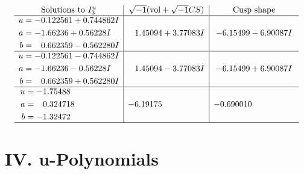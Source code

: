 \documentclass[1p]{elsarticle_modified}
\theoremstyle{definition}
\newcommand{\I}{\sqrt{-1}}
\begin{document}
$$\begin{array}{c|c|c}  
\text{Solutions to }I^u_{3}& \I (\text{vol} + \sqrt{-1}CS) & \text{Cusp shape}\\
 \hline 
\begin{aligned}
u &= -0.122561 + 0.744862 I \\
a &= -1.66236 + 0.56228 I \\
b &= \phantom{-}0.662359 - 0.562280 I\end{aligned}
 & \phantom{-}1.45094 + 3.77083 I & -6.15499 - 6.90087 I \\ \hline\begin{aligned}
u &= -0.122561 - 0.744862 I \\
a &= -1.66236 - 0.56228 I \\
b &= \phantom{-}0.662359 + 0.562280 I\end{aligned}
 & \phantom{-}1.45094 - 3.77083 I & -6.15499 + 6.90087 I \\ \hline\begin{aligned}
u &= -1.75488\phantom{ +0.000000I} \\
a &= \phantom{-}0.324718\phantom{ +0.000000I} \\
b &= -1.32472\phantom{ +0.000000I}\end{aligned}
 & -6.19175\phantom{ +0.000000I} & -0.690010\phantom{ +0.000000I}\\
 \hline 
 \end{array}$$\newpage
\newpage\renewcommand{\arraystretch}{1}
\centering \section*{ IV. u-Polynomials}
\end{document}
